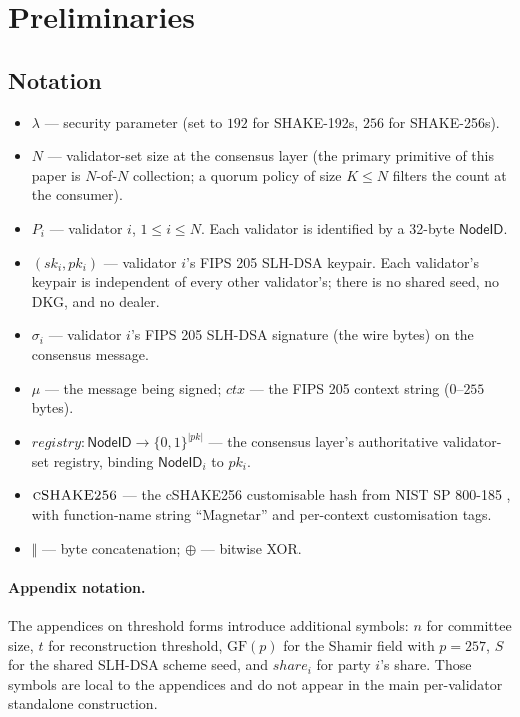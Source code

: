 \section{Preliminaries}
\label{sec:preliminaries}

\subsection{Notation}
\label{sec:prelim:notation}

\begin{itemize}[nosep,leftmargin=2em]
  \item $\lambda$ --- security parameter (set to $192$ for SHAKE-192s,
        $256$ for SHAKE-256s).
  \item $N$ --- validator-set size at the consensus layer (the
        primary primitive of this paper is $N$-of-$N$ collection;
        a quorum policy of size $K \le N$ filters the count at the
        consumer).
  \item $P_i$ --- validator $i$, $1 \le i \le N$. Each validator is
        identified by a 32-byte $\mathsf{NodeID}$.
  \item $(sk_i, pk_i)$ --- validator $i$'s FIPS 205 SLH-DSA keypair.
        Each validator's keypair is independent of every other
        validator's; there is no shared seed, no DKG, and no
        dealer.
  \item $\sigma_i$ --- validator $i$'s FIPS 205 SLH-DSA signature
        (the wire bytes) on the consensus message.
  \item $\mu$ --- the message being signed; $\mathit{ctx}$ --- the
        FIPS 205 context string ($0$--$255$ bytes).
  \item $\mathit{registry}: \mathsf{NodeID} \to \{0,1\}^{|pk|}$ ---
        the consensus layer's authoritative validator-set
        registry, binding $\mathsf{NodeID}_i$ to $pk_i$.
  \item $\textsc{cSHAKE256}$ --- the cSHAKE256 customisable hash
        from NIST SP 800-185 \cite{sp800185}, with function-name
        string ``Magnetar'' and per-context customisation tags.
  \item $\Vert$ --- byte concatenation; $\oplus$ --- bitwise XOR.
\end{itemize}

\paragraph{Appendix notation.} The appendices on threshold forms
introduce additional symbols: $n$ for committee size, $t$ for
reconstruction threshold, $\mathrm{GF}(p)$ for the Shamir field with
$p = 257$, $S$ for the shared SLH-DSA scheme seed, and
$\mathit{share}_i$ for party $i$'s share. Those symbols are local to
the appendices and do not appear in the main per-validator
standalone construction.

